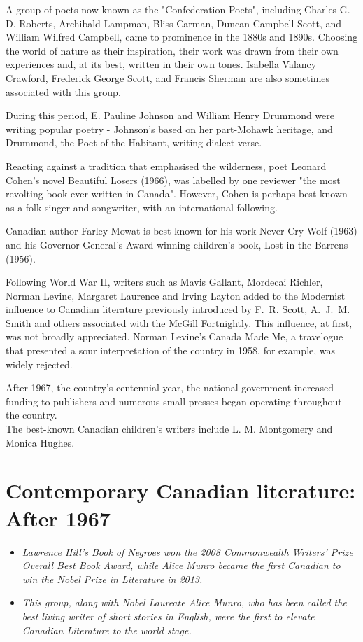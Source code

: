A group of poets now known as the "Confederation Poets", including
Charles G. D. Roberts, Archibald Lampman, Bliss Carman, Duncan Campbell
Scott, and William Wilfred Campbell, came to prominence in the 1880s and
1890s. Choosing the world of nature as their inspiration, their work was
drawn from their own experiences and, at its best, written in their own
tones. Isabella Valancy Crawford, Frederick George Scott, and Francis
Sherman are also sometimes associated with this group.

During this period, E. Pauline Johnson and William Henry Drummond were
writing popular poetry - Johnson's based on her part-Mohawk heritage,
and Drummond, the Poet of the Habitant, writing dialect verse.

Reacting against a tradition that emphasised the wilderness, poet
Leonard Cohen's novel Beautiful Losers (1966), was labelled by one
reviewer "the most revolting book ever written in Canada". However,
Cohen is perhaps best known as a folk singer and songwriter, with an
international following.

Canadian author Farley Mowat is best known for his work Never Cry Wolf
(1963) and his Governor General's Award-winning children's book, Lost in
the Barrens (1956).

Following World War II, writers such as Mavis Gallant, Mordecai Richler,
Norman Levine, Margaret Laurence and Irving Layton added to the
Modernist influence to Canadian literature previously introduced by
F.~R. Scott, A.~J.~M. Smith and others associated with the McGill
Fortnightly. This influence, at first, was not broadly appreciated.
Norman Levine's Canada Made Me, a travelogue that presented a sour
interpretation of the country in 1958, for example, was widely rejected.

After 1967, the country's centennial year, the national government
increased funding to publishers and numerous small presses began
operating throughout the country.\\
The best-known Canadian children's writers include L. M. Montgomery and
Monica Hughes.

\section{Contemporary Canadian literature: After
1967}\label{contemporary-canadian-literature-after-1967}

\begin{itemize}
\item
  \emph{Lawrence Hill's Book of Negroes won the 2008 Commonwealth
  Writers' Prize Overall Best Book Award, while Alice Munro became the
  first Canadian to win the Nobel Prize in Literature in 2013.}
\item
  \emph{This group, along with Nobel Laureate Alice Munro, who has been
  called the best living writer of short stories in English, were the
  first to elevate Canadian Literature to the world stage.}
\end{itemize}

